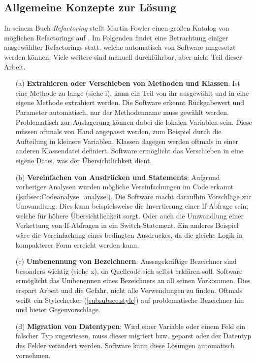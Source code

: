 \subsection{Allgemeine Konzepte zur Lösung}
\label{subsec:Refactoring_concepts}
In seinem Buch \textit{Refactoring} stellt Martin Fowler einen großen Katalog von möglichen Refactorings auf \cite[S. 99 - 387]{fowler2000}. Im Folgenden findet eine Betrachtung einiger ausgewählter Refactorings statt, welche automatisch von Software umgesetzt werden können. Viele weitere sind manuell durchführbar, aber nicht Teil dieser Arbeit. 
\begin{itemize}
	\item[(a)] \textbf{Extrahieren oder Verschieben von Methoden und Klassen}: Ist eine Methode zu lange (siehe i), kann ein Teil von ihr ausgewählt und in eine eigene Methode extrahiert werden. Die Software erkennt Rückgabewert und Parameter automatisch, nur der Methodenname muss gewählt werden. Problematisch zur Auslagerung können dabei die lokalen Variablen sein. Diese müssen oftmals von Hand angepasst werden, zum Beispiel durch die Aufteilung in kleinere Variablen.
	Klassen dagegen werden oftmals in einer anderen Klassendatei definiert. Software ermöglicht das Verschieben in eine eigene Datei, was der Übersichtlichkeit dient. 
	\item[(b)] \textbf{Vereinfachen von Ausdrücken und Statements}: Aufgrund vorheriger Analysen wurden mögliche Vereinfachungen im Code erkannt (\autoref{subsec:Codeanalyse_analyse}). Die Software macht daraufhin Vorschläge zur Umwandlung. Dies kann beispielsweise die Invertierung einer If-Abfrage sein, welche für höhere Übersichtlichkeit sorgt. Oder auch die Umwandlung einer Verkettung von If-Abfragen in ein Switch-Statement. Ein anderes Beispiel wäre die Vereinfachung eines bedingten Ausdruckes, da die gleiche Logik in kompakterer Form erreicht werden kann.
	\item[(c)] \textbf{Umbenennung von Bezeichnern}: Aussagekräftige Bezeichner sind besonders wichtig (siehe x), da Quellcode sich selbst erklären soll. Software ermöglicht das Umbenennen eines Bezeichners an all seinen Vorkommen. Dies erspart Arbeit und die Gefahr, nicht alle Verwendungen zu finden. Oftmals weißt ein Stylechecker (\autoref{subsubsec:style}) auf problematische Bezeichner hin und bietet Gegenvorschläge.
	\item[(d)] \textbf{Migration von Datentypen}: Wird einer Variable oder einem Feld ein falscher Typ zugewiesen, muss dieser migriert bzw. geparst oder der Datentyp des Felder verändert werden. Software kann diese Lösungen automatisch vornehmen.

\end{itemize}
